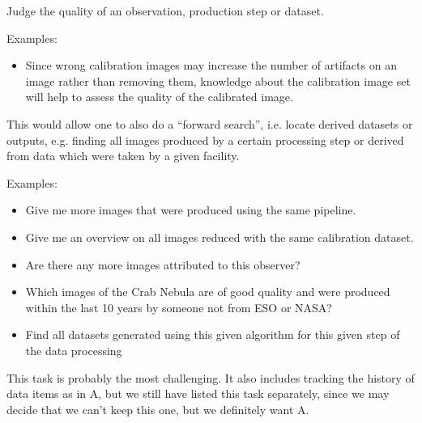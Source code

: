         Judge the quality of an observation, production step or dataset.
        
        \noindent Examples:
        \begin{itemize}
            \item Since wrong calibration images may increase the
number of artifacts on an image rather than removing them, knowledge about
the calibration image set will help to assess the quality of the calibrated
image.  
        \end{itemize}
      

        This would allow one to also do a ``forward search'', i.e. locate derived datasets or outputs, e.g. finding all images produced by a certain processing step or derived from data which were taken by a given facility.
        
        \noindent Examples:
        \begin{itemize}
            \item Give me more images that were produced using the same pipeline.  
            \item Give me an overview on all images reduced with the same calibration dataset.  
            \item Are there any more images attributed to this observer?  
            \item Which images of the Crab Nebula are of good quality and were produced within the last 10 years by someone not from ESO or NASA?
            \item Find all datasets generated using this given algorithm for this given step of the data processing
        \end{itemize}

        This task is probably the most challenging. It also includes tracking the history of data items as in A, but we still have listed this task separately, since we may decide that we can't keep this one, but we definitely want A.
